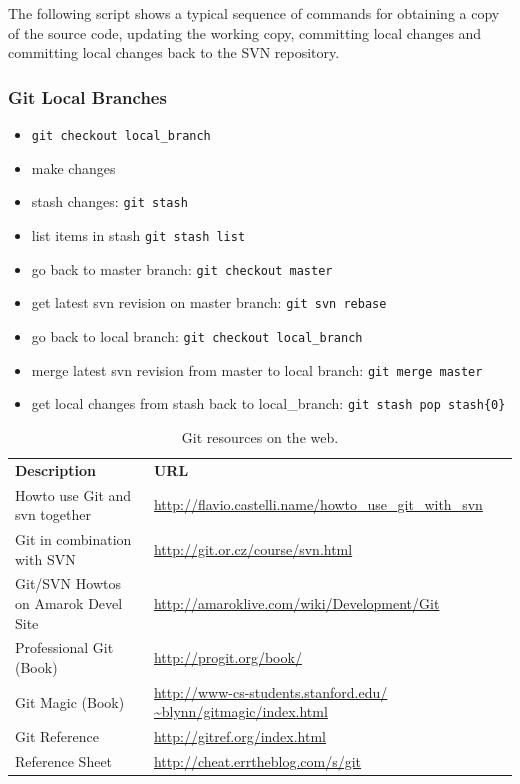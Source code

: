 The following script shows a typical sequence of commands for obtaining a copy
of the  source code, updating the  working copy, committing  local changes and
committing local changes back to the SVN repository.



\subsubsection{Git Local Branches}


\begin{itemize}
\item {\tt git checkout local\_branch}
\item make changes
\item stash changes: {\tt git stash}
\item list items in stash {\tt git stash list}
\item go back to master branch: {\tt git checkout master}
\item get latest svn revision on master branch: {\tt git svn rebase}
\item go back to local branch: {\tt git checkout local\_branch}
\item merge latest svn revision from master to local branch: {\tt git merge master}
\item get local changes from stash back to local\_branch: {\tt git stash pop stash\@\{0\}}
\end{itemize}


\begin{table}[tb]
\centering
\begin{minipage}{18cc}\caption{Git resources on the web.}
\label{tab:git_materials}
\end{minipage}
\par\medskip\noindent
\begin{tabular}{ll}
  \toprule
  {\bf Description} & {\bf URL} \\ \otoprule
  Howto use Git and svn together & \url{http://flavio.castelli.name/howto_use_git_with_svn} \\
  Git in combination with SVN & \url{http://git.or.cz/course/svn.html} \\
  Git/SVN Howtos on Amarok Devel Site & \url{http://amaroklive.com/wiki/Development/Git} \\
  Professional Git (Book) & \url{http://progit.org/book/} \\
  Git Magic (Book) & \url{http://www-cs-students.stanford.edu/ ~blynn/gitmagic/index.html} \\
  Git Reference & \url{http://gitref.org/index.html} \\
  Reference Sheet & \url{http://cheat.errtheblog.com/s/git} \\
  \bottomrule
\end{tabular} 
\end{table}


